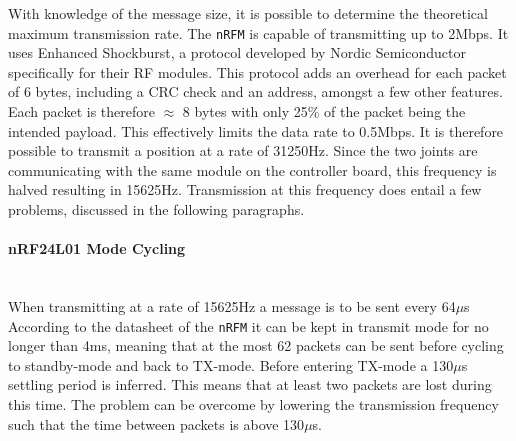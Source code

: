 With knowledge of the message size, it is possible to determine the theoretical maximum transmission rate.
The \texttt{nRFM} is capable of transmitting up to 2Mbps.
It uses Enhanced Shockburst, a protocol developed by Nordic Semiconductor specifically for their RF modules.
This protocol adds an overhead for each packet of 6 bytes, including a CRC check and an address, amongst a few other features.
Each packet is therefore $\approx$ 8 bytes with only 25\% of the packet being the intended payload.
This effectively limits the data rate to 0.5Mbps.
It is therefore possible to transmit a position at a rate of 31250Hz.
Since the two joints are communicating with the same module on the controller board, this frequency is halved resulting in 15625Hz.
Transmission at this frequency does entail a few problems, discussed in the following paragraphs.
\paragraph{nRF24L01 Mode Cycling}~\\ %
\label{par:nrf24l01_mode_cycling}
When transmitting at a rate of 15625Hz a message is to be sent every 64$\mu$s
According to the datasheet of the \texttt{nRFM} it can be kept in transmit mode for no longer than 4ms, meaning that at the most 62 packets can be sent before cycling to standby-mode and back to TX-mode.
Before entering TX-mode a 130$\mu$s settling period is inferred.
This means that at least two packets are lost during this time.
The problem can be overcome by lowering the transmission frequency such that the time between packets is above 130$\mu$s.


